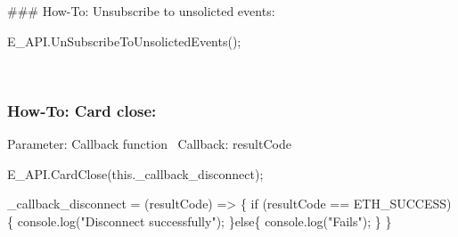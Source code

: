 \#\#\# How-\/\+To\+: Unsubscribe to unsolicted events\+: 
\begin{DoxyCode}
E\_API.UnSubscribeToUnsolictedEvents();
\end{DoxyCode}
 ~\newline


\subsubsection*{How-\/\+To\+: Card close\+:}

Parameter\+: Callback function~\newline
 Callback\+: result\+Code 
\begin{DoxyCode}
E\_API.CardClose(this.\_callback\_disconnect);

\_callback\_disconnect = (resultCode) => \{
    if (resultCode == ETH\_SUCCESS)\{
        console.log("Disconnect successfully");
    \}else\{
        console.log("Fails");
    \}
\}
\end{DoxyCode}
 